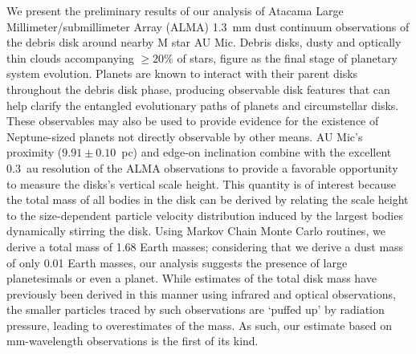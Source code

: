 \documentclass[12 pt, letterpaper]{article}
\begin{document}
\abstract
  We present the preliminary results of our analysis of Atacama Large Millimeter/submillimeter Array (ALMA) 1.3~mm dust continuum observations of the debris disk around nearby M star AU Mic.
  Debris disks, dusty and optically thin clouds accompanying $\geq 20\%$ of stars, figure as the final stage of planetary system evolution. 
  Planets are known to interact with their parent disks throughout the debris disk phase, producing observable disk features that can help clarify the entangled evolutionary paths of planets and circumstellar disks. 
  These observables may also be used to provide evidence for the existence of Neptune-sized planets not directly observable by other means. 
  AU Mic's proximity ($9.91 \pm 0.10$~pc) and edge-on inclination combine with the excellent 0.3~au resolution of the ALMA observations to provide a favorable opportunity to measure the disks's vertical scale height. 
  This quantity is of interest because the total mass of all bodies in the disk can be derived by relating the scale height to the size-dependent particle velocity distribution induced by the largest bodies dynamically stirring the disk. 
  Using Markov Chain Monte Carlo routines, we derive a total mass of 1.68 Earth masses; considering that we derive a dust mass of only 0.01 Earth masses, our analysis suggests the presence of large planetesimals or even a planet.
  While estimates of the total disk mass have previously been derived in this manner using infrared and optical observations, the smaller particles traced by such observations are `puffed up' by radiation pressure, leading to overestimates of the mass. 
  As such, our estimate based on mm-wavelength observations is the first of its kind.
\end{document}
